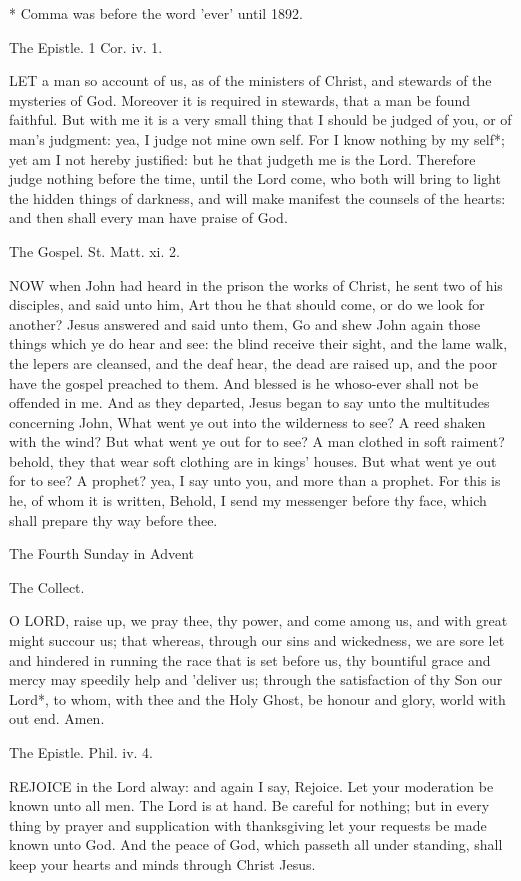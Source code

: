 * Comma was before the word 'ever' until 1892.
 

The Epistle. 1 Cor. iv. 1.

LET a man so account of us, as of the ministers of Christ, and stewards of the mysteries of God. Moreover it is required in stewards, that a man be found faithful. But with me it is a very small thing that I should be judged of you, or of man's judgment: yea, I judge not mine own self. For I know nothing by my self*; yet am I not hereby justified: but he that judgeth me is the Lord. Therefore judge nothing before the time, until the Lord come, who both will bring to light the hidden things of darkness, and will make manifest the counsels of the hearts: and then shall every man have praise of God. 
 

The Gospel. St. Matt. xi. 2.

NOW when John had heard in the prison the works of Christ, he sent two of his disciples, and said unto him, Art thou he that should come, or do we look for another? Jesus answered and said unto them, Go and shew John again those things which ye do hear and see: the blind receive their sight, and the lame walk, the lepers are cleansed, and the deaf hear, the dead are raised up, and the poor have the gospel preached to them. And blessed is he whoso-ever shall not be offended in me. And as they departed, Jesus began to say unto the multitudes concerning John, What went ye out into the wilderness to see? A reed shaken with the wind? But what went ye out for to see? A man clothed in soft raiment? behold, they that wear soft clothing are in kings' houses. But what went ye out for to see? A prophet? yea, I say unto you, and more than a prophet. For this is he, of whom it is written, Behold, I send my messenger before thy face, which shall prepare thy way before thee.

 
The Fourth Sunday in Advent
 
The Collect.

O LORD, raise up, we pray thee, thy power, and come among us, and with great might succour us; that whereas, through our sins and wickedness, we are sore let and hindered in running the race that is set before us, thy bountiful grace and mercy may speedily help and 'deliver us; through the satisfaction of thy Son our Lord*, to whom, with thee and the Holy Ghost, be honour and glory, world with out end. Amen. 
 

The Epistle. Phil. iv. 4.

REJOICE in the Lord alway: and again I say, Rejoice. Let your moderation be known unto all men. The Lord is at hand. Be careful for nothing; but in every thing by prayer and supplication with thanksgiving let your requests be made known unto God. And the peace of God, which passeth all under standing, shall keep your hearts and minds through Christ Jesus. 
 

